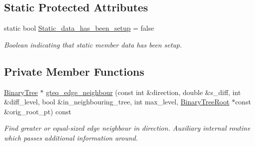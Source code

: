 \subsection*{Static Protected Attributes}
\begin{DoxyCompactItemize}
\item 
static bool \hyperlink{classoomph_1_1BinaryTree_a5890507c23970c4e2604fb65a546b9b4}{Static\+\_\+data\+\_\+has\+\_\+been\+\_\+setup} = false
\begin{DoxyCompactList}\small\item\em Boolean indicating that static member data has been setup. \end{DoxyCompactList}\end{DoxyCompactItemize}
\subsection*{Private Member Functions}
\begin{DoxyCompactItemize}
\item 
\hyperlink{classoomph_1_1BinaryTree}{Binary\+Tree} $\ast$ \hyperlink{classoomph_1_1BinaryTree_aef4ea20b1eb9525513a505975a61d35d}{gteq\+\_\+edge\+\_\+neighbour} (const int \&direction, double \&s\+\_\+diff, int \&diff\+\_\+level, bool \&in\+\_\+neighbouring\+\_\+tree, int max\+\_\+level, \hyperlink{classoomph_1_1BinaryTreeRoot}{Binary\+Tree\+Root} $\ast$const \&orig\+\_\+root\+\_\+pt) const
\begin{DoxyCompactList}\small\item\em Find greater or equal-\/sized edge neighbour in direction. Auxiliary internal routine which passes additional information around. \end{DoxyCompactList}\end{DoxyCompactItemize}
